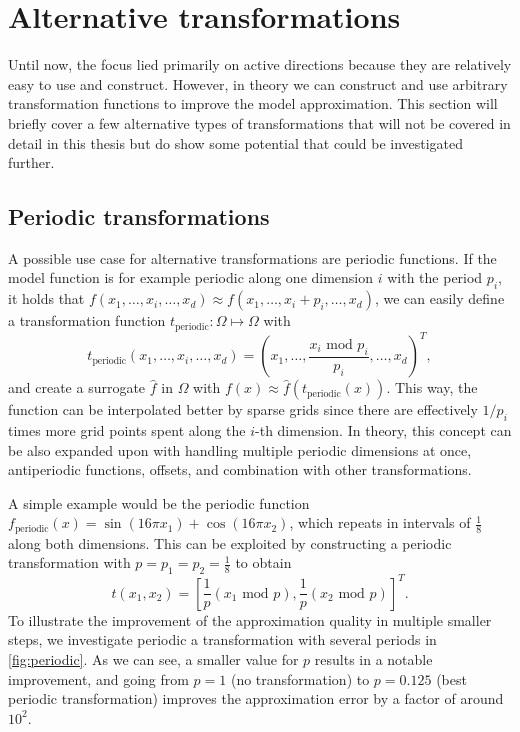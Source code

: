 \documentclass[
  a4paper,  %
  twoside,  %
  bibliography=totoc,
  headsepline,
  cleardoublepage=empty,
  parskip=half,
  draft=false
]{scrbook}
\begin{document}
\section{Alternative transformations}

Until now, the focus lied primarily on active directions because they are relatively easy to use and construct.
However, in theory we can construct and use arbitrary transformation functions to improve the model approximation.
This section will briefly cover a few alternative types of transformations that will not be covered in detail in this thesis but do show some potential that could be investigated further.

\subsection{Periodic transformations}

A possible use case for alternative transformations are periodic functions.
If the model function is for example periodic along one dimension $i$ with the period $p_i$, \ie it holds that $f(x_1,\dots,x_i,\dots,x_d) \approx f(x_1,\dots,x_i + p_i, \dots,x_d)$, we can easily define a transformation function $t_{\text{periodic}} \colon \Omega \mapsto \Omega$ with
\begin{equation}
t_{\text{periodic}}(x_1,\dots,x_i,\dots,x_d) = (x_1,\dots, \frac{x_i\text{ mod } p_i}{p_i}, \dots,x_d)^T,
\label{eq:per}
\end{equation}
and create a surrogate $\hat{f}$ in $\Omega$ with $f(x) \approx \hat{f}(t_{\text{periodic}}(x))$.
This way, the function can be interpolated better by sparse grids since there are effectively $1 / p_i$ times more grid points spent along the $i$-th dimension.
In theory, this concept can be also expanded upon with handling multiple periodic dimensions at once, antiperiodic functions, offsets, and combination with other transformations.

A simple example would be the periodic function $f_{\text{periodic}}(x)=\sin(16\pi x_1)  + \cos(16\pi x_2)$, which repeats in intervals of $\frac{1}{8}$ along both dimensions.
This can be exploited by constructing a periodic transformation with $p=p_1=p_2=\frac{1}{8}$ to obtain
\begin{equation}
t(x_1,x_2) = \left[\frac{1}{p} \left(x_1 \text{ mod } p\right), \frac{1}{p} \left(x_2 \text{ mod } p\right)\right]^T.
\end{equation}
%
To illustrate the improvement of the approximation quality in multiple smaller steps, we investigate periodic a transformation with several periods in \cref{fig:periodic}.
As we can see, a smaller value for $p$ results in a notable improvement, and going from $p=1$ (no transformation) to $p=0.125$ (best periodic transformation) improves the approximation error by a factor of around $10^2$.
\end{document}
